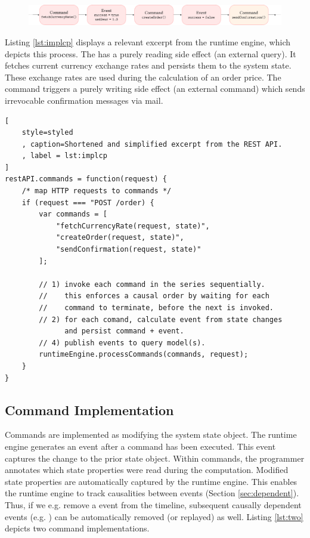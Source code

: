 \begin{figure}[h!]
	\centering
	\includegraphics[width=1.0\textwidth]
		{../illustrations/projections3.pdf}

\end{figure}

Listing \ref{lst:implcp} displays a relevant excerpt from the runtime engine, 
which depicts this process.
The  has a purely reading side effect (an external 
query). It fetches current currency exchange rates and persists them to the 
system state. These exchange rates are used during the calculation of an order 
price. The  command triggers a purely writing side 
effect (an external command) which sends irrevocable confirmation messages 
via mail.

\begin{lstlisting}[
	style=styled 
	, caption=Shortened and simplified excerpt from the REST API.
	, label = lst:implcp
]
restAPI.commands = function(request) {
	/* map HTTP requests to commands */
	if (request === "POST /order) {
		var commands = [
			"fetchCurrencyRate(request, state)",
			"createOrder(request, state)",
			"sendConfirmation(request, state)"
		];

		// 1) invoke each command in the series sequentially.
		//    this enforces a causal order by waiting for each 
		//    command to terminate, before the next is invoked.
		// 2) for each comand, calculate event from state changes
		      and persist command + event.
		// 4) publish events to query model(s).
		runtimeEngine.processCommands(commands, request);
	}
}
\end{lstlisting}

\subsection{Command Implementation}
Commands are implemented as modifying the system state object. The runtime 
engine generates an event after a command has been executed. This event
captures the change to the prior state object.
%
Within commands, the programmer annotates which state properties were read 
during the computation. 
Modified state properties are automatically captured by the runtime engine.
This enables the runtime engine to track causalities between events (Section 
\ref{sec:dependent}).
%
Thus, if we e.g. remove a  event from the timeline, 
subsequent causally dependent events (e.g. ) can be 
automatically removed (or replayed) as well.
Listing \ref{lst:two} depicts two command implementations.

